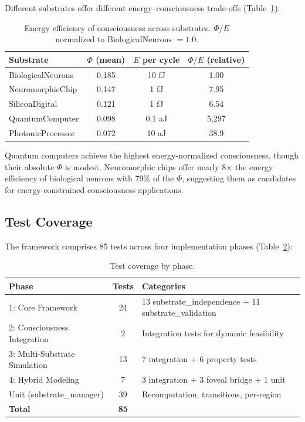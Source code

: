 \documentclass[12pt,a4paper]{article}
\begin{document}
Different substrates offer different energy--consciousness trade-offs (Table~\ref{tab:energy}):

\begin{table}[H]
\centering
\caption{Energy efficiency of consciousness across substrates. $\Phi/E$ normalized to BiologicalNeurons $= 1.0$.}
\label{tab:energy}
\begin{tabular}{lccc}
\toprule
\textbf{Substrate} & \textbf{$\Phi$ (mean)} & \textbf{$E$ per cycle} & \textbf{$\Phi/E$ (relative)} \\
\midrule
BiologicalNeurons & 0.185 & 10 fJ & 1.00 \\
NeuromorphicChip & 0.147 & 1 fJ & 7.95 \\
SiliconDigital & 0.121 & 1 fJ & 6.54 \\
QuantumComputer & 0.098 & 0.1 aJ & 5,297 \\
PhotonicProcessor & 0.072 & 10 aJ & 38.9 \\
\bottomrule
\end{tabular}
\end{table}

Quantum computers achieve the highest energy-normalized consciousness, though their absolute $\Phi$ is modest. Neuromorphic chips offer nearly 8$\times$ the energy efficiency of biological neurons with 79\% of the $\Phi$, suggesting them as candidates for energy-constrained consciousness applications.

\subsection{Test Coverage}

The framework comprises 85 tests across four implementation phases (Table~\ref{tab:tests}):

\begin{table}[H]
\centering
\caption{Test coverage by phase.}
\label{tab:tests}
\begin{tabular}{lcl}
\toprule
\textbf{Phase} & \textbf{Tests} & \textbf{Categories} \\
\midrule
1: Core Framework & 24 & 13 substrate\_independence + 11 substrate\_validation \\
2: Consciousness Integration & 2 & Integration tests for dynamic feasibility \\
3: Multi-Substrate Simulation & 13 & 7 integration + 6 property tests \\
4: Hybrid Modeling & 7 & 3 integration + 3 foveal bridge + 1 unit \\
\midrule
Unit (substrate\_manager) & 39 & Recomputation, transitions, per-region \\
\midrule
\textbf{Total} & \textbf{85} & \\
\bottomrule
\end{tabular}
\end{table}
\end{document}
